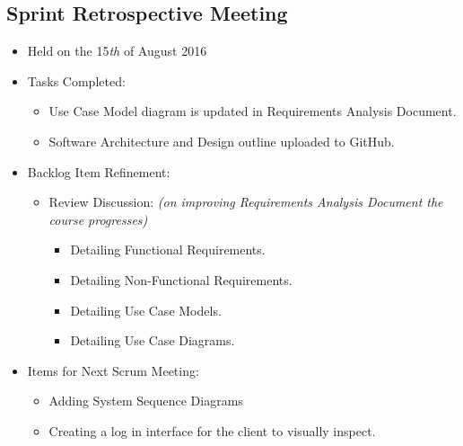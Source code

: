 \documentclass[a4paper]{article}
\begin{document}
\subsection{Sprint Retrospective Meeting}

\begin{itemize}

\item Held on the 15\textit{th} of August 2016

\item Tasks Completed:

\begin{itemize}

\item Use Case Model diagram is updated in Requirements Analysis Document.

\item Software Architecture and Design outline uploaded to GitHub.

\end{itemize}

\item Backlog Item Refinement:

\begin{itemize}

\item Review Discussion: \emph{(on improving Requirements Analysis Document the course progresses)}

\begin{itemize}

\item Detailing Functional Requirements.

\item Detailing Non-Functional Requirements.

\item Detailing Use Case Models.

\item Detailing Use Case Diagrams.

\end{itemize}

\end{itemize}

\item Items for Next Scrum Meeting:

\begin{itemize}

\item Adding System Sequence Diagrams

\item Creating a log in interface for the client to visually inspect.


\end{itemize}
\end{itemize}
\end{document}
